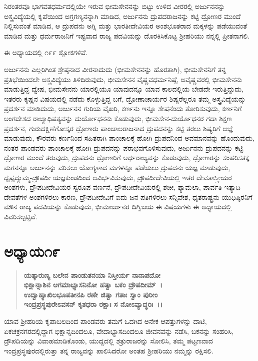 ನಿರಂತರವೂ ಭಾಗವತಧರ್ಮದಲ್ಲಿಯೇ ಇರುವ ಭೀಮಸೇನನನ್ನು ಬಿಟ್ಟು ಉಳಿದ ವೀರರಲ್ಲಿ ಅರ್ಜುನನನ್ನು ಅಸ್ತ್ರವಿದ್ಯೆಯಲ್ಲಿ ಕೃಪೆಯಿಂದ ಅಗ್ರಗಣ್ಯನನ್ನಾಗಿ ಮಾಡಿದ, ಅರ್ಜುನನು ದ್ರುಪದರಾಜನನ್ನು ಕಟ್ಟಿ ದ್ರೋಣರ ಮುಂದೆ ನಿಲ್ಲಿಸುವಂತೆ ಮಾಡಿದ, ಆ ದ್ರುಪದನು ಅಗ್ನಿ ಮತ್ತು ಭಾರತೀದೇವಿಯರ ಅಂಶಭೂತರಾದ ಮಕ್ಕಳನ್ನು ಪಡೆಯುವಂತೆ ಮಾಡಿದ ಮತ್ತು ಧರ್ಮರಾಜನಿಗೆ ಇಷ್ಟವಾದ ರಾಜ್ಯ ಪದವಿಯನ್ನು ದೊರಕಿಸಿಕೊಟ್ಟ ಶ‍್ರೀಹರಿಯು ನನ್ನಲ್ಲಿ ಪ್ರೀತನಾಗಲಿ.

ಈ ಅಧ್ಯಾಯದಲ್ಲಿ ೧೯೯ ಶ್ಲೋಕಗಳಿವೆ.

ಅರ್ಜುನನು ಎಲ್ಲರಿಗಿಂತ ಶ್ರೇಷ್ಠನಾದ ವೀರನಾದುದು (ಭೀಮಸೇನನನ್ನು ಹೊರತಾಗಿ), ಭೀಮಸೇನನಿಗೆ ತನ್ನ ಪ್ರತಿಭೆಯಿಂದಲೇ ಅಸ್ತ್ರವಿದ್ಯೆಯು ತಿಳಿದಿರುವುದು, ಭೀಮಸೇನನ ವೈಷ್ಣವಧರ್ಮನಿಷ್ಠೆ, ಅವೈಷ್ಣವರಲ್ಲಿ ಭೀಮಸೇನನು ಮಾಡುತ್ತಿದ್ದ ದ್ವೇಷ, ಭೀಮಸೇನನು ಯಾರಲ್ಲಿಯೂ ಯಾವುದನ್ನೂ ಯಾವ ಕಾಲದಲ್ಲಿಯ ಬೇಡದೇ ಇರುತ್ತಿದ್ದುದು, ಇತರರು ಕೃಷ್ಣನ ವಿಷಯದಲ್ಲಿ ನಡೆದು ಕೊಳ್ಳುತ್ತಿದ್ದ ಬಗೆ, ದ್ರೋಣಾಚಾರ್ಯರ ಶಿಷ್ಯರೆಲ್ಲರೂ ತಮ್ಮ ಅಸ್ತ್ರವಿದ್ಯೆಯನ್ನು ಪ್ರದರ್ಶನ ಮಾಡಿದುದು, ಅರ್ಜುನನ ಗುರಿಯ ವೈಖರಿ, ಕರ್ಣನು ಇನ್ನೂ ಶೇಷನೆಂದು ತೋರಿಸುವುದು, ಕರ್ಣನಿಗೆ ಅಂಗದೇಶದ ರಾಜ್ಯಾಧಿಪತ್ಯವನ್ನು ದುರ್ಯೋಧನನು ಕೊಡುವುದು, ಭೀಮಸೇನ-ದುರ್ಯೊಧನರ ಗದಾ ಶಿಕ್ಷಣ ಪ್ರದರ್ಶನ, ಗುರುದಕ್ಷಿಣೆಗೋಸ್ಕರ ದ್ರೋಣರು ಪಾಂಚಾಲರಾಜನಾದ ದ್ರುಪದನನ್ನು ಕಟ್ಟಿ ತರಲು ಶಿಷ್ಯರಿಗೆ ಆಜ್ಞೆ ಮಾಡುವುದು, ಕೌರವರು ಕರ್ಣನಿಂದ ಸಹಿತರಾಗಿ ಪಾಂಚಾಲಕ್ಕೆ ಹೋಗಿ ದ್ರುಪದನಿಂದ ಅವಮಾನವನ್ನು ಹೊಂದುವುದು, ನಂತರ ಪಾಂಡವರು ಪಾಂಚಾಲಕ್ಕೆ ಹೋಗಿ ದ್ರುಪದನನ್ನು ಪರಾಭವಗೊಳಿಸುವುದು, ಅರ್ಜುನನು ದ್ರುಪದನನ್ನು ಕಟ್ಟಿ ದ್ರೋಣರ ಮುಂದೆ ತರುವುದು, ದ್ರುಪದನು ದ್ರೋಣರಿಗೆ ಅರ್ಧರಾಜ್ಯವನ್ನು ಕೊಡುವುದು, ದ್ರೋಣರನ್ನು ಸಂಹರಿಸತಕ್ಕ ಮಗನನ್ನೂ ಅರ್ಜುನನ್ನು ವರಿಸಲು ಯೋಗ್ಯಳಾದ ಮಗಳನ್ನೂ ಪಡೆಯಲು ದ್ರುಪದನು ಯಜ್ಞ ಮಾಡು\-ವುದು, ಧೃಷ್ಟದ್ಯುಮ್ಮ-ದ್ರೌಪದೀ ಯಜ್ಞಕುಂಡದಿಂದ ಆವಿರ್ಭವಿಸುವುದು, ದ್ರೌಪದೀದೇವಿಯಲ್ಲಿ ಇತರ ದೇವತಾಸ್ತ್ರೀಯರ ಅಂಶಗಳು, ದ್ರೌಪದೀದೇವಿಯರ ಸ್ವರೂಪ ವರ್ಣನೆ, ದ್ರೌಪದೀದೇವಿಯರಲ್ಲಿ ಶಚೀ, ಶ್ಯಾಮಲಾ, ಪಾರ್ವತಿ ಇತ್ಯಾದಿ ದೇವತೆಗಳ ಅಂಶಗಳಿರಲು ಕಾರಣ, ದ್ರೌಪದೀದೇವಿಗೆ ಐದು ಜನ ಪತಿಗಳಿರಲು ಸನ್ನಿವೇಶ, ಧೃತರಾಷ್ಟ್ರನು ಯುಧಿಷ್ಠಿರನಿಗೆ ಮೌನ ರಾಜ್ಯ ಪದವಿಯನ್ನು ಕೊಡುವುದು, ಭೀಮಾರ್ಜುನರ ದಿಗ್ವಿಜಯ ಈ ವಿಷಯಗಳು ಈ ಅಧ್ಯಾಯದಲ್ಲಿ ವಿವರಿಸಲ್ಪಟ್ಟಿವೆ.


\section*{ಅಧ್ಯಾಯ\enginline{-}೧೯}

\begin{verse}
\textbf{ಯತ್ಕಾರುಣ್ಯ ಬಲೇನ ಪಾಂಡುತನಯಾ ನಿಸ್ತೀರ್ಯ ನಾನಾಪದೋ}\\\textbf{ ಭಿಕ್ಷಾನ್ನಾಶಿನ ಆಗಮಾಭ್ಯಾಸನಿನೋ ಹತ್ವಾ ಬಕಂ ದ್ರೌಪದೀಮ್~।}\\\textbf{ಉದ್ವಾಹ್ಯಾಖಿಲಭೂಪತೀನಪಿ ರಣೇ ಜಿತ್ವಾ ಗತಾಃ ಸ್ವಾಂ ಪುರೀಂ} \\\textbf{ಇಂದ್ರಪ್ರಸ್ಥಪುರೇಽವಸನ್ ಕೃತಧರಾ ರಕ್ಷಾಃ ಸ ನೋಽವ್ಯಾದ್ಧರಿಃ~।।}
\end{verse}

ಯಾವ ಶ‍್ರೀಹರಿಯ ಕೃಪಾಬಲದಿಂದ ಪಾಂಡವರು ತಮಗೆ ಒದಗಿದ ಅನೇಕ ಆಪತ್ತುಗಳನ್ನು ದಾಟಿ, ಏಕಚಕ್ರನಗರದಲ್ಲಿದ್ದಾಗ ಭಿಕ್ಷಾನ್ನದಿಂದಲೂ, ವೇದಾಭ್ಯಾಸದಿಂದಲೂ ಜೀವನ\-ವನ್ನು ನಡೆಸಿ, ಬಕನನ್ನು ಸಂಹರಿಸಿ, ದ್ರೌಪದಿಯನ್ನು ವಿವಾಹಮಾಡಿಕೊಂಡು, ಯುದ್ದದಲ್ಲಿ ಶತ್ರುರಾಜರನ್ನು ಸೋಲಿಸಿ, ತಮ್ಮ ಪಟ್ಟಣವಾದ ಇಂದ್ರಪ್ರಸ್ಥಪುರದಲ್ಲಿರುತ್ತಾ ತನ್ನ ರಾಜ್ಯವನ್ನು ಪಾಲಿಸಿದರೋ ಅಂತಹ ಶ‍್ರೀಹರಿಯು ನಮ್ಮನ್ನು ರಕ್ಷಿಸಲಿ.

